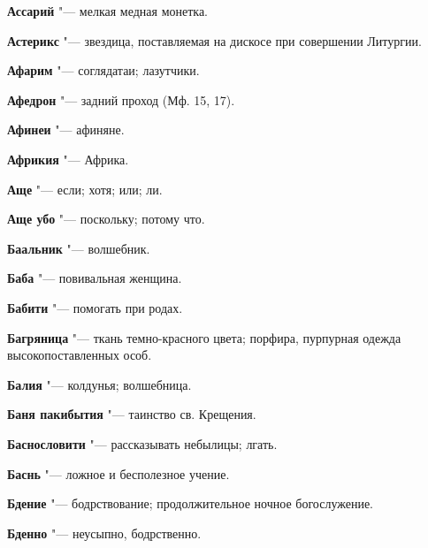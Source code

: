 \begin{mymulticols}{2}
\noindent\textbf{Ассарий} "--- мелкая медная монетка. 




\noindent\textbf{Астерикс} "--- звездица, поставляемая на дискосе при совершении Литургии. 




\noindent\textbf{Афарим} "--- соглядатаи; лазутчики. 




\noindent\textbf{Афедрон} "--- задний проход (Мф. 15, 17). 




\noindent\textbf{Афинеи} "--- афиняне. 




\noindent\textbf{Африкия} "--- Африка. 




\noindent\textbf{Аще} "--- если; хотя; или; ли. 




\noindent\textbf{Аще убо} "--- поскольку; потому что. 









\noindent\textbf{Баальник} "--- волшебник. 




\noindent\textbf{Баба} "--- повивальная женщина. 




\noindent\textbf{Бабити} "--- помогать при родах. 




\noindent\textbf{Багряница} "--- ткань темно-красного цвета; порфира, пурпурная одежда высокопоставленных особ. 




\noindent\textbf{Балия} "--- колдунья; волшебница. 




\noindent\textbf{Баня пакибытия} "--- таинство св. Крещения. 




\noindent\textbf{Баснословити} "--- рассказывать небылицы; лгать. 




\noindent\textbf{Баснь} "--- ложное и бесполезное учение. 




\noindent\textbf{Бдение} "--- бодрствование; продолжительное ночное богослужение. 




\noindent\textbf{Бденно} "--- неусыпно, бодрственно. 





\end{mymulticols}
